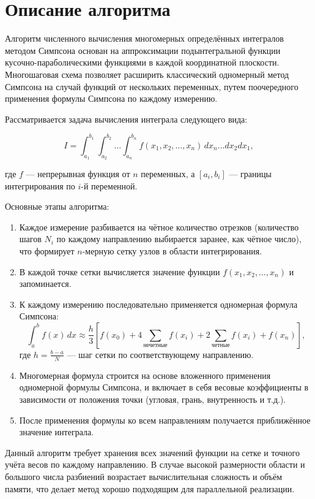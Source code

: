 \documentclass[a4paper,12pt]{article}
\begin{document}
\section{Описание алгоритма}

Алгоритм численного вычисления многомерных определённых интегралов методом Симпсона основан на аппроксимации подынтегральной функции кусочно-параболическими функциями в каждой координатной плоскости. Многошаговая схема позволяет расширить классический одномерный метод Симпсона на случай функций от нескольких переменных, путем поочередного применения формулы Симпсона по каждому измерению.

Рассматривается задача вычисления интеграла следующего вида:

\[
I = \int_{a_1}^{b_1} \int_{a_2}^{b_2} \dots \int_{a_n}^{b_n} f(x_1, x_2, \dots, x_n) \, dx_n \dots dx_2 dx_1,
\]

где $f$ — непрерывная функция от $n$ переменных, а $[a_i, b_i]$ — границы интегрирования по $i$-й переменной.

Основные этапы алгоритма:

\begin{enumerate}
    \item Каждое измерение разбивается на чётное количество отрезков (количество шагов $N_i$ по каждому направлению выбирается заранее, как чётное число), что формирует $n$-мерную сетку узлов в области интегрирования.

    \item В каждой точке сетки вычисляется значение функции $f(x_1, x_2,\dots, x_n)$ и запоминается.

    \item К каждому измерению последовательно применяется одномерная формула Симпсона:
    $$\int_a^b f(x)\,dx \approx \frac{h}{3}\left[f(x_0) + 4 \sum_{\text{нечетные}} f(x_i) + 2 \sum_{\text{четные}} f(x_i) + f(x_n)\right],$$
    где $h = \frac{b - a}{N}$ — шаг сетки по соответствующему направлению.

    \item Многомерная формула строится на основе вложенного применения одномерной формулы Симпсона, и включает в себя весовые коэффициенты в зависимости от положения точки (угловая, грань, внутренность и т.д.).

    \item После применения формулы ко всем направлениям получается приближённое значение интеграла.
\end{enumerate}

Данный алгоритм требует хранения всех значений функции на сетке и точного учёта весов по каждому направлению. В случае высокой размерности области и большого числа разбиений возрастает вычислительная сложность и объём памяти, что делает метод хорошо подходящим для параллельной реализации.
\end{document}
